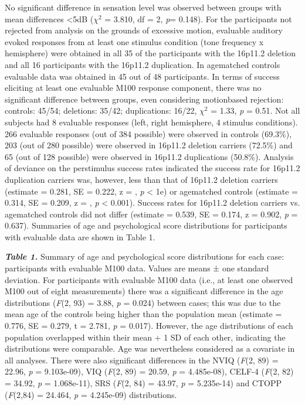 \documentclass{article}
\begin{document}
No significant difference in sensation level was observed between groups with mean differences \textless 5dB ($\chi^2$ = 3.810, df = 2, \emph{p}= 0.148).  For the participants not rejected from analysis on the grounds of excessive motion, evaluable auditory evoked responses from at least one stimulus condition (tone frequency x hemisphere) were obtained in all 35 of the participants with the 16p11.2 deletion and all 16 participants with the 16p11.2 duplication. In age\-matched controls evaluable data was obtained in 45 out of 48 participants. In terms of success eliciting at least one evaluable M100 response component, there was no significant difference between groups, even considering motion\-based rejection: controls: 45/54; deletions: 35/42; duplications: 16/22, $\chi^2$ = 1.33, \emph{p} = 0.51. Not all subjects had 8 evaluable responses (left, right hemisphere, 4 stimulus conditions). 266 evaluable responses (out of 384 possible) were observed in controls (69.3\%), 203 (out of 280 possible) were observed in 16p11.2 deletion carriers (72.5\%) and 65 (out of 128 possible) were observed in 16p11.2 duplications (50.8\%). Analysis of deviance on the per\-stimulus success rates indicated the success rate for 16p11.2 duplication carriers was, however, less than that of 16p11.2 deletion carriers (estimate = 0.281, SE = 0.222, z = , \emph{p} <  1e) or age\-matched controls (estimate = 0.314, SE = 0.209, z = , \emph{p} < 0.001). Success rates for 16p11.2 deletion carriers vs. age\-matched controls did not differ (estimate = 0.539, SE = 0.174, z = 0.902, \emph{p} = 0.637). Summaries of age and psychological score distributions for participants with evaluable data are shown in Table 1.



\bigskip




\emph{\textbf{Table 1.}} Summary of age and psychological score distributions for each case: participants with evaluable M100 data.  Values are means ± one standard deviation.  For participants with evaluable M100 data (i.e., at least one observed M100 out of eight measurements) there was a significant difference in the age distributions (\emph{F}(2, 93) = 3.88, \emph{p} = 0.024) between cases; this was due to the mean age of the controls being higher than the population mean (estimate = 0.776, SE = 0.279, t = 2.781, \emph{p} = 0.017). However, the age distributions of each population overlapped within their mean + 1 SD of each other, indicating the distributions were comparable.  Age was nevertheless considered as a covariate in all analyses. There were also significant differences in the NVIQ (\emph{F}(2, 89) = 22.96, \emph{p} = 9.103e-09), VIQ (\emph{F}(2, 89) = 20.59, \emph{p} = 4.485e-08), CELF-4 (\emph{F}(2, 82) = 34.92, \emph{p} = 1.068e-11), SRS (\emph{F}(2, 84) = 43.97, \emph{p} = 5.235e-14) and CTOPP (\emph{F}(2,84) = 24.464, \emph{p} = 4.245e-09) distributions.  
\end{document}
